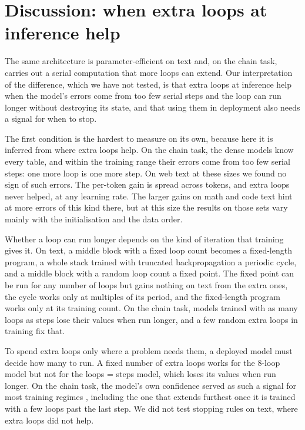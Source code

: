 \section{Discussion: when extra loops at inference help}
\label{sec:discussion}

The same architecture is parameter-efficient on text and, on the chain task, carries out a serial computation that more
loops can extend. Our interpretation of the difference, which we have not tested, is that extra loops at inference help when the model's
errors come from too few serial steps and the loop can run longer without destroying its state, and that using them in
deployment also needs a signal for when to stop.

The first condition is the hardest to measure on its own, because here it is inferred from where extra loops help. On
the chain task, the dense models know every table, and within the training range their errors come from too few serial
steps: one more loop is one more step. On web text at these sizes we found no sign of such errors. The per-token gain is
spread across tokens, and extra loops never helped, at any learning rate. The larger gains on math and code text hint at
more errors of this kind there, but at this size the results on those sets vary mainly with the initialisation and the
data order.

Whether a loop can run longer depends on the kind of iteration that training gives it. On text, a middle block with a
fixed loop count becomes a fixed-length program, a whole stack trained with truncated backpropagation a periodic cycle,
and a middle block with a random loop count a fixed point. The fixed point can be run for any number of loops but gains nothing on text from the extra ones, the cycle works only
at multiples of its period, and the fixed-length program works only at its training count. On the chain task, models trained with as many loops as steps lose their values
when run longer, and a few random extra loops in training fix that.

To spend extra loops only where a problem needs them, a deployed model must decide how many to run. A fixed number of
extra loops works for the 8-loop model but not for the loops = steps model, which loses its values when run longer. On
the chain task, the model's own confidence served as such a signal for most training regimes , including the one
that extends furthest once it is trained with a few loops past the last step. We
did not test stopping rules on text, where extra loops did not help.


